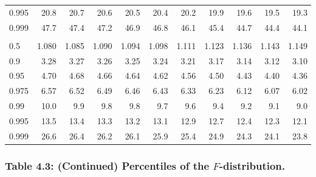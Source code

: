 \documentclass[
]{article}
\begin{document}
\begin{table}[H]
\begin{tabular}{lrrrrrrrrrr}
\hspace{1em}0.995 & 20.8 & 20.7 & 20.6 & 20.5 & 20.4 & 20.2 & 19.9 & 19.6 & 19.5 & 19.3\\
\hspace{1em}0.999 & 47.7 & 47.4 & 47.2 & 46.9 & 46.8 & 46.1 & 45.4 & 44.7 & 44.4 & 44.1\\
\addlinespace[0.3em]
\multicolumn{11}{l}{\textbf{$k_2=5$}}\\
\hspace{1em}0.5 & 1.080 & 1.085 & 1.090 & 1.094 & 1.098 & 1.111 & 1.123 & 1.136 & 1.143 & 1.149\\
\hspace{1em}0.9 & 3.28 & 3.27 & 3.26 & 3.25 & 3.24 & 3.21 & 3.17 & 3.14 & 3.12 & 3.10\\
\hspace{1em}0.95 & 4.70 & 4.68 & 4.66 & 4.64 & 4.62 & 4.56 & 4.50 & 4.43 & 4.40 & 4.36\\
\hspace{1em}0.975 & 6.57 & 6.52 & 6.49 & 6.46 & 6.43 & 6.33 & 6.23 & 6.12 & 6.07 & 6.02\\
\hspace{1em}0.99 & 10.0 & 9.9 & 9.8 & 9.8 & 9.7 & 9.6 & 9.4 & 9.2 & 9.1 & 9.0\\
\hspace{1em}0.995 & 13.5 & 13.4 & 13.3 & 13.2 & 13.1 & 12.9 & 12.7 & 12.4 & 12.3 & 12.1\\
\hspace{1em}0.999 & 26.6 & 26.4 & 26.2 & 26.1 & 25.9 & 25.4 & 24.9 & 24.3 & 24.1 & 23.8\\
\bottomrule
\end{tabular}
\end{table}

\newpage

\hypertarget{table-4.3-continued-percentiles-of-the-f-distribution.}{%
\subsubsection{\texorpdfstring{Table 4.3: (Continued) Percentiles of the
\(F\)-distribution.}{Table 4.3: (Continued) Percentiles of the F-distribution.}}\label{table-4.3-continued-percentiles-of-the-f-distribution.}}
\end{document}
